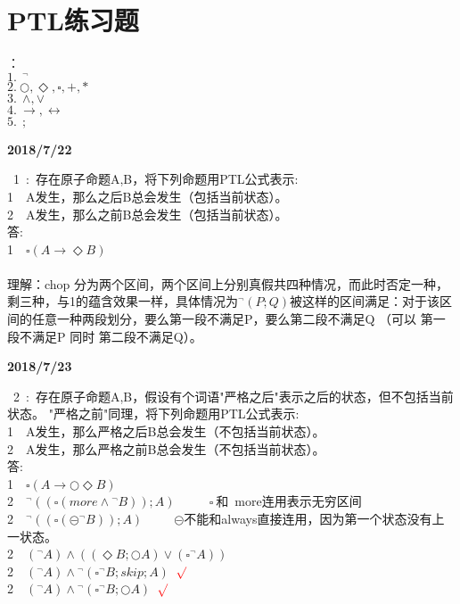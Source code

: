 \section{PTL练习题}

：\\
$1.~~{^\lnot}$\\
$2.~\bigcirc,\Diamond,\square,+,*$\\
$3.~~\wedge,\vee$\\
$4.~\rightarrow,\leftrightarrow$\\
$5.~~;$

\textbf{2018/7/22}

~1~:~存在原子命题A,B，将下列命题用PTL公式表示:\\
\textcircled{\footnotesize{1}}~~A发生，那么之后B总会发生（包括当前状态）。\\
\textcircled{\footnotesize{2}}~~A发生，那么之前B总会发生（包括当前状态）。\\
答:\\
\textcircled{\footnotesize{1}}~~$\square(A\rightarrow\Diamond B)$ \\
{\\
理解：chop 分为两个区间，两个区间上分别真假共四种情况，而此时否定一种，剩三种，与\textcircled{\footnotesize{1}}的蕴含效果一样，具体情况为$ ^\lnot(P;Q) $被这样的区间满足：对于该区间的任意一种两段划分，要么第一段不满足P，要么第二段不满足Q （可以 第一段不满足P 同时 第二段不满足Q）。}

\textbf{2018/7/23}

~2~:~存在原子命题A,B，假设有个词语"严格之后"表示之后的状态，但不包括当前状态。
"严格之前"同理，将下列命题用PTL公式表示:\\
\textcircled{\footnotesize{1}}~~A发生，那么严格之后B总会发生（不包括当前状态）。\\
\textcircled{\footnotesize{2}}~~A发生，那么严格之前B总会发生（不包括当前状态）。\\
答:\\
\textcircled{\footnotesize{1}}~~$\square(A\rightarrow\bigcirc\Diamond B)$ \\
\textcircled{\footnotesize{2}}~~$^\lnot((\square(more\wedge{^\lnot B}));A)$~{\color{red}{$\times$}~~~~$~\square~$和~more连用表示无穷区间~}\\
\textcircled{\footnotesize{2}}~~$^\lnot((\square(\circleddash{^\lnot B}));A)$~{\color{red}{$\times$}~~~~$\circleddash$不能和always直接连用，因为第一个状态没有上一状态。}\\
\textcircled{\footnotesize{2}}~~$({^\lnot}A)\wedge((\Diamond B;\bigcirc A)\vee(\square{^\lnot A}))$~{\color{red}{?}}\\
\textcircled{\footnotesize{2}}~~$({^\lnot}A)\wedge{^\lnot(\square{^\lnot B;skip;A})}$~${\color{red}{\surd}}$~~~~{\color{red}{题目的隐含意思有A不可能发生在起始状态}}\\
\textcircled{\footnotesize{2}}~~$({^\lnot}A)\wedge{^\lnot(\square{^\lnot B;\bigcirc A})}$~${\color{red}{\surd}}$~~~~{\color{red}{题目的隐含意思有A不可能发生在起始状态}}\\

